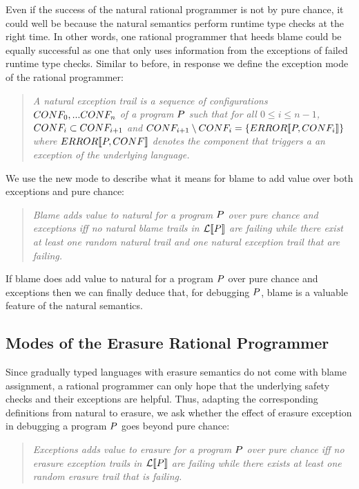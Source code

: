 Even if the success of the natural rational programmer is not by pure
chance, it could well be because the natural semantics perform runtime type checks at
the right time. In other words, one rational programmer that 
heeds blame could be equally successful as one that only uses information from the exceptions of failed 
runtime type checks. Similar to before, in response we
define the exception mode of the rational programmer:
\begin{quote}
\it 
A natural exception trail
is a sequence of configurations $CONF_0,...CONF_n$ of a program
$P$ such that for all $0 \leq i \leq n - 1$, $CONF_i \subset CONF_{i+1}$ and
$CONF_{i+1} \setminus CONF_i = \{ERROR\llbracket P, CONF_i\rrbracket\}$
  where $ERROR\llbracket P, CONF\rrbracket$ denotes the component that triggers a
an exception of the underlying language.
\end{quote}
\noindent
We use the new mode to describe what it means for blame to add value over both exceptions and pure
chance:
\begin{quote}
\it
  Blame adds value to natural for a program $P$ over pure chance and
  exceptions iff no natural blame trails in  $\mathcal{L}\llbracket P\rrbracket$ are failing while 
 there exist at least one random natural trail and one natural exception trail
 that are
  failing.
\end{quote}
\noindent
If blame does add value to natural for a program $P$ 
over pure chance and exceptions then we can finally
deduce that, for debugging $P$, blame is a valuable feature of the
natural semantics.



\subsection{Modes of the Erasure Rational Programmer} \label{sub:erasure}

 Since gradually typed languages with erasure semantics do not come with blame
assignment, a rational programmer can only hope that the underlying safety
checks and their exceptions are helpful.  Thus, adapting the corresponding
definitions from natural to erasure, we ask whether the effect of erasure
exception in debugging a program $P$ goes beyond pure chance: 

\begin{quote}
\it
  Exceptions adds value to erasure for a program $P$ over pure chance
  iff no erasure exception trails in  $\mathcal{L}\llbracket P\rrbracket$ are failing while 
 there exists at least one random erasure trail that is failing.
\end{quote}
\noindent


